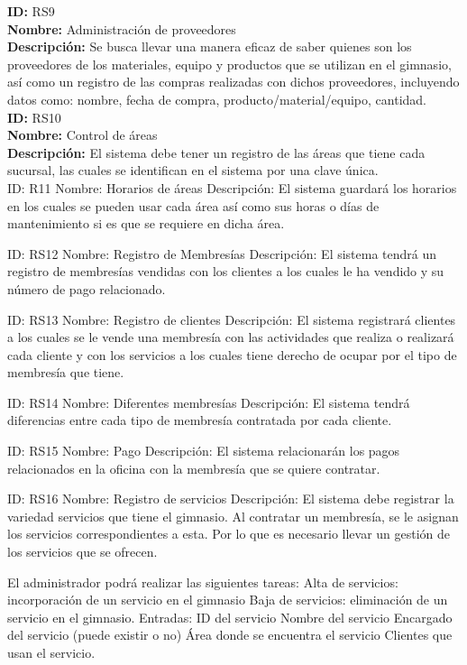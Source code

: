 \textbf{ID:} RS9\\
\textbf{Nombre:}  Administración de proveedores\\
\textbf{Descripción:} Se busca llevar una manera eficaz de saber quienes son los proveedores de los materiales, equipo y productos que se utilizan en el gimnasio, así como un registro de las compras realizadas con dichos proveedores, incluyendo datos como: nombre, fecha de compra, producto/material/equipo, cantidad.\\

\textbf{ID:} RS10\\
\textbf{Nombre:} Control de áreas\\
\textbf{Descripción:} El sistema debe tener un registro de las áreas que tiene cada sucursal, las cuales se identifican en el sistema por una clave única.\\

ID: R11
Nombre: Horarios de áreas
Descripción: El sistema guardará los horarios en los cuales se pueden usar cada área así como sus horas o días de mantenimiento si es que se requiere en dicha área.

ID: RS12
Nombre: Registro de Membresías
Descripción: El sistema tendrá un registro de membresías vendidas con los clientes a los cuales le ha vendido y su número de pago relacionado.

ID: RS13
Nombre: Registro de clientes
Descripción: El sistema registrará clientes a los cuales se le vende una membresía con las actividades que realiza o realizará cada cliente y con los servicios a los cuales tiene derecho de ocupar por el tipo de membresía que tiene.

ID: RS14
Nombre: Diferentes membresías
Descripción: El sistema tendrá diferencias entre cada tipo de membresía contratada por cada cliente.

ID: RS15
Nombre: Pago
Descripción: El sistema relacionarán los pagos relacionados en la oficina con la membresía que se quiere contratar.

ID: RS16
Nombre: Registro de servicios
Descripción: El sistema debe registrar la variedad servicios que tiene el gimnasio. Al contratar un membresía, se le asignan los servicios correspondientes a esta. Por lo que es necesario llevar un gestión de los servicios que se ofrecen.

El administrador podrá realizar las siguientes tareas:
Alta de servicios: incorporación de un servicio en el gimnasio
Baja de servicios: eliminación de un servicio en el gimnasio.
Entradas:
ID del servicio
           Nombre del servicio
          Encargado del servicio (puede existir o no)
          Área donde se encuentra el servicio
          Clientes que usan el servicio.
 
